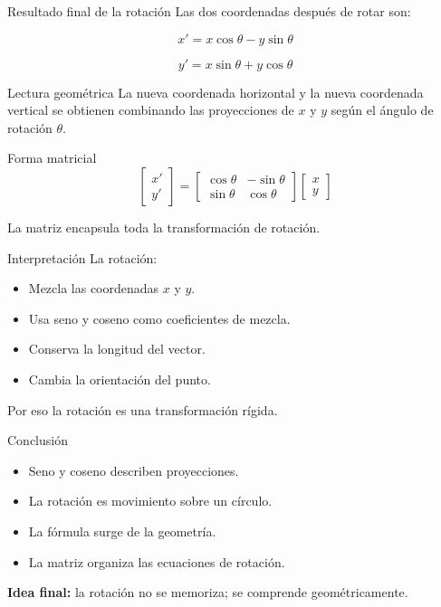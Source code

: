 \documentclass{beamer}
\begin{document}
\begin{frame}{Resultado final de la rotación}
Las dos coordenadas después de rotar son:

\[
x'=x\cos\theta-y\sin\theta
\]

\[
y'=x\sin\theta+y\cos\theta
\]

\begin{block}{Lectura geométrica}
La nueva coordenada horizontal y la nueva coordenada vertical se obtienen combinando las proyecciones de \(x\) y \(y\) según el ángulo de rotación \(\theta\).
\end{block}
\end{frame}


\begin{frame}{Forma matricial}
\[
\begin{bmatrix}
x' \\
y'
\end{bmatrix}
=
\begin{bmatrix}
\cos\theta & -\sin\theta \\
\sin\theta & \cos\theta
\end{bmatrix}
\begin{bmatrix}
x \\
y
\end{bmatrix}
\]

\medskip

La matriz encapsula toda la transformación de rotación.
\end{frame}


\begin{frame}{Interpretación}
La rotación:

\begin{itemize}
\item Mezcla las coordenadas \(x\) y \(y\).
\item Usa seno y coseno como coeficientes de mezcla.
\item Conserva la longitud del vector.
\item Cambia la orientación del punto.
\end{itemize}

\medskip

Por eso la rotación es una transformación rígida.
\end{frame}

\begin{frame}{Conclusión}
\begin{itemize}
\item Seno y coseno describen proyecciones.
\item La rotación es movimiento sobre un círculo.
\item La fórmula surge de la geometría.
\item La matriz organiza las ecuaciones de rotación.
\end{itemize}

\medskip

\textbf{Idea final:} la rotación no se memoriza; se comprende geométricamente.
\end{frame}
\end{document}
